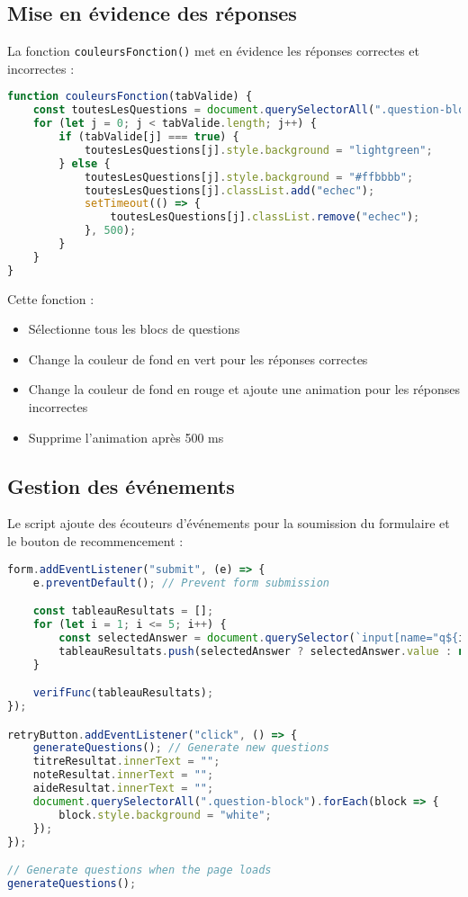\documentclass{article}
\begin{document}
\subsection{Mise en évidence des réponses}
La fonction \texttt{couleursFonction()} met en évidence les réponses correctes et incorrectes :

\begin{lstlisting}[language=JavaScript]
function couleursFonction(tabValide) {
    const toutesLesQuestions = document.querySelectorAll(".question-block");
    for (let j = 0; j < tabValide.length; j++) {
        if (tabValide[j] === true) {
            toutesLesQuestions[j].style.background = "lightgreen";
        } else {
            toutesLesQuestions[j].style.background = "#ffbbbb";
            toutesLesQuestions[j].classList.add("echec");
            setTimeout(() => {
                toutesLesQuestions[j].classList.remove("echec");
            }, 500);
        }
    }
}
\end{lstlisting}

Cette fonction :
\begin{itemize}
    \item Sélectionne tous les blocs de questions
    \item Change la couleur de fond en vert pour les réponses correctes
    \item Change la couleur de fond en rouge et ajoute une animation pour les réponses incorrectes
    \item Supprime l'animation après 500 ms
\end{itemize}

\subsection{Gestion des événements}
Le script ajoute des écouteurs d'événements pour la soumission du formulaire et le bouton de recommencement :

\begin{lstlisting}[language=JavaScript]
form.addEventListener("submit", (e) => {
    e.preventDefault(); // Prevent form submission

    const tableauResultats = [];
    for (let i = 1; i <= 5; i++) {
        const selectedAnswer = document.querySelector(`input[name="q${i}"]:checked`);
        tableauResultats.push(selectedAnswer ? selectedAnswer.value : null);
    }

    verifFunc(tableauResultats);
});

retryButton.addEventListener("click", () => {
    generateQuestions(); // Generate new questions
    titreResultat.innerText = "";
    noteResultat.innerText = "";
    aideResultat.innerText = "";
    document.querySelectorAll(".question-block").forEach(block => {
        block.style.background = "white";
    });
});

// Generate questions when the page loads
generateQuestions();
\end{lstlisting}
\end{document}
